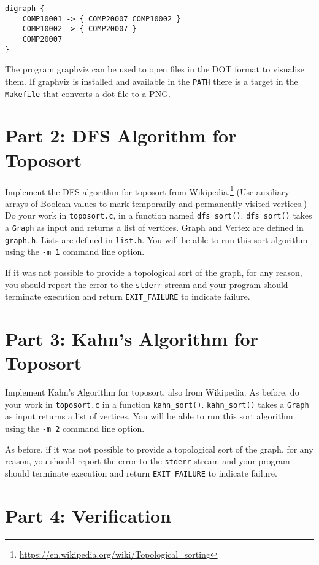 \documentclass[11pt]{article}
\begin{document}
\begin{verbatim}
digraph {
    COMP10001 -> { COMP20007 COMP10002 }
    COMP10002 -> { COMP20007 }
    COMP20007
}
\end{verbatim}

The program graphviz can be used to open files in the DOT format to visualise them.
If graphviz is installed and available in the \texttt{PATH} there is a target in the \texttt{Makefile} that converts a dot file to a PNG\@.

\section*{Part 2: DFS Algorithm for Toposort}

Implement the DFS algorithm for toposort from Wikipedia.\footnote{\url{https://en.wikipedia.org/wiki/Topological_sorting}}
(Use auxiliary arrays of Boolean values to mark temporarily and permanently visited vertices.)
Do your work in \texttt{toposort.c}, in a function named \texttt{dfs\_sort()}.
\texttt{dfs\_sort()} takes a \texttt{Graph} as input and returns a list of vertices.
Graph and Vertex are defined in \texttt{graph.h}. Lists are defined in \texttt{list.h}.
You will be able to run this sort algorithm using the \texttt{-m 1} command line option.

If it was not possible to provide a topological sort of the graph, for any reason,
you should report the error to the \texttt{stderr} stream and your
program should terminate execution and return \texttt{EXIT\_FAILURE} to indicate failure.

\section*{Part 3: Kahn's Algorithm for Toposort}

Implement Kahn's Algorithm for toposort, also from Wikipedia.
As before, do your work in \texttt{toposort.c} in a function \texttt{kahn\_sort()}.
\texttt{kahn\_sort()} takes a \texttt{Graph} as input returns a list of vertices.
You will be able to run this sort algorithm using the \texttt{-m 2} command line option.

As before, if it was not possible to provide a topological sort of the graph, for any reason,
you should report the error to the \texttt{stderr} stream and your
program should terminate execution and return \texttt{EXIT\_FAILURE} to indicate failure.

\section*{Part 4: Verification}
\end{document}
